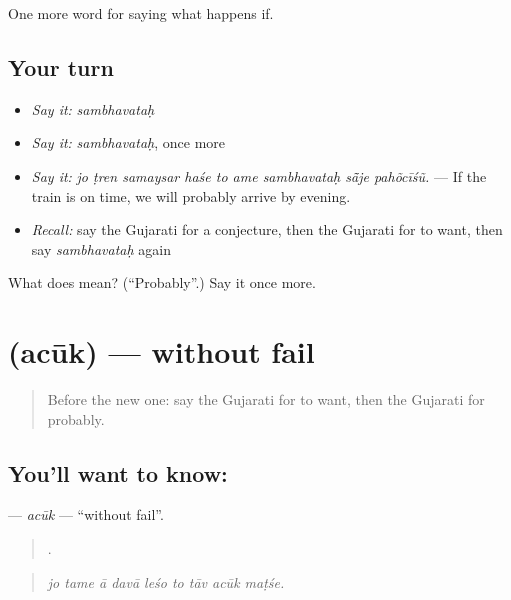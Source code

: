 \begin{grammarlens}[title={What you've built}]
One more word for saying what happens if.
\end{grammarlens}

\subsection*{Your turn}
\begin{itemize}
\raggedright
  \item \emph{Say it:} \emph{sambhavataḥ}
  \item \emph{Say it:} \emph{sambhavataḥ}, once more
  \item \emph{Say it:} \emph{jo ṭren samaysar haśe to ame sambhavataḥ sā̃je pahõcīśũ.} — If the train is on time, we will probably arrive by evening.
  \item \emph{Recall:} say the Gujarati for a conjecture, then the Gujarati for to want, then say \emph{sambhavataḥ} again
\end{itemize}

\begin{tcolorbox}[breakable,colback=teal!4,colframe=teal!35!black,title={Before you move on}]
What does  mean? (\textquotedblleft{}Probably\textquotedblright{}.) Say it once more.
\end{tcolorbox}
\section[\texorpdfstring{\gu{અચૂક} (acūk)}{અચૂક (acūk)}]{ (acūk) — without fail}

\label{lesson:GU-C367-acuk}



\begin{quote}
Before the new one: say the Gujarati for to want, then the Gujarati for probably.
\end{quote}

\subsection*{You'll want to know: }
\textbf{} — \emph{acūk} — \textquotedblleft{}without fail\textquotedblright{}.

\begin{quote}
        .
\end{quote}

\begin{quote}
\emph{jo tame ā davā leśo to tāv acūk maṭśe.}
\end{quote}

